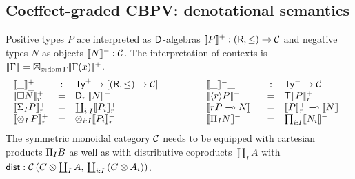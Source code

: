 \documentclass[acmsmall,review,anonymous]{acmart}\settopmatter{printfolios=true,printccs=false,printacmref=false}
\begin{document}


\subsection{Coeffect-graded CBPV: denotational semantics}



Positive types $P$ are interpreted as $\D$-algebras
$\denp P : (\R,\leq) \to \CC$ and negative types $N$ as objects
$\denn N : \CC$.
The interpretation of contexts is
$\den \Gamma = \boxtimes_{x:\dom\Gamma} \denp{\Gamma(x)}$.
\[
\begin{array}{lcl}
  \Denp\_\_ & : & \PTy \to [(\R,\leq) \to \CC] \\
  \Denp{\Box N}    r & = & \D[r]\, \denn N \\
  \Denp{\sumt I P} r & = & \coprod_{i:I} \Denp{P_i} r \\
  \Denp{\tupt I P} r & = & \otimes_{i:I} \Denp{P_i} r \\
\end{array}
\qquad\qquad
\begin{array}{lcl}
  \denn\_\_ & : & \NTy \to \CC \\
  \denn{\compty r P} & = & \T \Denp P r \\
  \denn{\qfun r P N} & = & \Denp P r \lolli \denn N \\
  \denn{\rect I N}   & = & \prod_{i:I} \denn{N_i} \\
\end{array}
\]
The symmetric monoidal category $\CC$ needs to be equipped with cartesian
products $\rect I B$ as well as with distributive coproducts
$\coprod_I A$ with
$\tdist : \Hom {C \otimes \coprod_I A} {\coprod_{i:I} {(C \otimes A_i)}}$.
\end{document}
